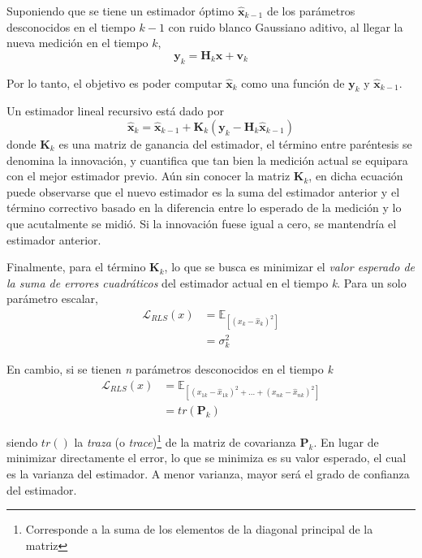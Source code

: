 Suponiendo que se tiene un estimador óptimo $\hat{\bm{x}}_{k-1}$ de los parámetros desconocidos en el tiempo $k-1$ con ruido blanco Gaussiano aditivo, al llegar la nueva medición en el tiempo $k$,
\begin{equation}
    \bm{y}_k = \bm{H}_k \bm{x} + \bm{v}_k
\end{equation}

Por lo tanto, el objetivo es poder computar $\hat{\bm{x}}_k$ como una función de $\bm{y}_k$ y $\hat{\bm{x}}_{k-1}$.

Un estimador lineal recursivo está dado por
\begin{equation}
    \hat{\bm{x}}_k = \hat{\bm{x}}_{k-1} + \bm{K}_k (\bm{y}_k - \bm{H}_k \hat{\bm{x}}_{k-1})
\end{equation}
donde $\bm{K}_k$ es una matriz de ganancia del estimador, el término entre paréntesis se denomina la innovación, y cuantifica que tan bien la medición actual se equipara con el mejor estimador previo. Aún sin conocer la matriz $\bm{K}_k$, en dicha ecuación puede observarse que el nuevo estimador es la suma del estimador anterior y el término correctivo basado en la diferencia entre lo esperado de la medición y lo que acutalmente se midió. Si la innovación fuese igual a cero, se mantendría el estimador anterior.

Finalmente, para el término $\bm{K}_k$, lo que se busca es minimizar el \textit{valor esperado de la suma de errores cuadráticos} del estimador actual en el tiempo \textit{k}. Para un solo parámetro escalar,
\begin{align}
    \mathscr{L}_{RLS}(x) &= \mathbb{E}_{[(x_k - \hat{x}_k)^2]} \\
                         &= \sigma_k^2
\end{align}

En cambio, si se tienen \textit{n} parámetros desconocidos en el tiempo \textit{k}
\begin{align}
    \mathscr{L}_{RLS}(x) &= \mathbb{E}_{[(x_{1k} - \hat{x}_{1k})^2 + ... + (x_{nk} - \hat{x}_{nk})^2]} \\
                         &= tr(\bm{P}_k)
\end{align}

siendo $tr()$ la \textit{traza} (o \textit{trace})\footnote{Corresponde a la suma de los elementos de la diagonal principal de la matriz} de la matriz de covarianza $\bm{P}_k$. En lugar de minimizar directamente el error, lo que se minimiza es su valor esperado, el cual es la varianza del estimador. A menor varianza, mayor será el grado de confianza del estimador.

